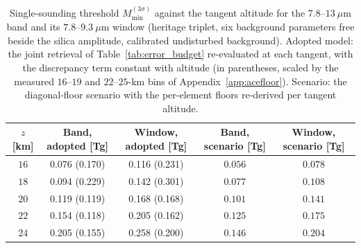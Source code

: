 \begin{table}[t]
\caption{Single-sounding threshold $M_{\min}^{(3\sigma)}$ against the tangent altitude for the $7.8$--$13~\mu$m band and its $7.8$--$9.3~\mu$m window (heritage triplet, six background parameters free beside the silica amplitude, calibrated undisturbed background). Adopted model: the joint retrieval of Table~\ref{tab:error_budget} re-evaluated at each tangent, with the discrepancy term constant with altitude (in parentheses, scaled by the measured $16$--$19$ and $22$--$25$-km bins of Appendix~\ref{app:acefloor}). Scenario: the diagonal-floor scenario with the per-element floors re-derived per tangent altitude.}
\label{tab:altitude_scan}
\centering
\small
\begin{tabular}{ccccc}
\toprule
$z$ [km] & Band, adopted [Tg] & Window, adopted [Tg] & Band, scenario [Tg] & Window, scenario [Tg] \\
\midrule
$16$ & 0.076 (0.170) & 0.116 (0.231) & $0.056$ & $0.078$ \\
$18$ & 0.094 (0.229) & 0.142 (0.301) & $0.077$ & $0.108$ \\
$20$ & 0.119 (0.119) & 0.168 (0.168) & $0.101$ & $0.141$ \\
$22$ & 0.154 (0.118) & 0.205 (0.162) & $0.125$ & $0.175$ \\
$24$ & 0.205 (0.155) & 0.258 (0.200) & $0.146$ & $0.204$ \\
\bottomrule
\end{tabular}
\end{table}

